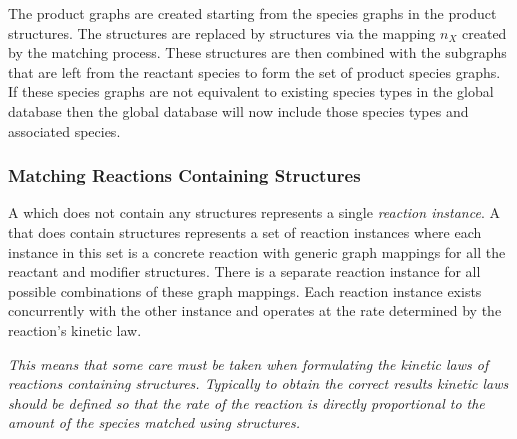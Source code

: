 \documentclass{cekarticle}
\begin{document}
The product graphs are created starting from the species graphs in
the product  structures.  The
 structures are replaced by
 structures via the mapping $n_{X}$ created by
the matching process. These structures are then combined with the
subgraphs that are left from the reactant species to form the set
of product species graphs. If these species graphs are not
equivalent to existing species types in the global database then
the global database will now include those species types and
associated species.

\subsubsection{Matching Reactions Containing  Structures}

A  which does not contain any 
structures represents a single \emph{reaction instance}.  A
 that does contain  structures
represents a set of reaction instances where each instance in this
set is a concrete reaction with generic graph mappings for all the
reactant and modifier  structures.
There is a separate reaction instance for all possible
combinations of these graph mappings. Each reaction instance
exists concurrently with the other instance and operates at the
rate determined by the reaction's kinetic law.

\emph{This means that some care must be taken when formulating the
kinetic laws of reactions containing 
structures.  Typically to obtain the correct results kinetic laws
should be defined so that the rate of the reaction is directly
proportional to the amount of the species matched using
 structures.}
\end{document}
